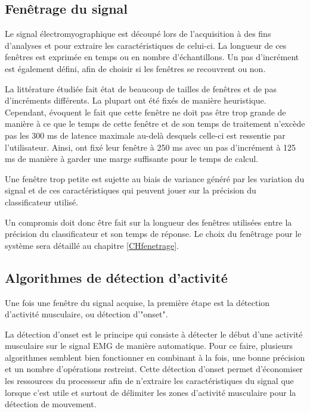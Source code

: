 \documentclass[letterpaper, twoside, 12pt, memoire, creativecommons, hyperref]{thETS}
\begin{document}
\subsection{Fenêtrage du signal}

Le signal électromyographique est découpé lors de l'acquisition à des fins d'analyses et pour extraire les caractéristiques de celui-ci. La longueur de ces fenêtres est exprimée en temps ou en nombre d'échantillons. Un pas d’incrément est également défini, afin de choisir si les fenêtres se recouvrent ou non. 

La littérature étudiée fait état de beaucoup de tailles de fenêtres et de pas d’incréments différents. La plupart ont été fixés de manière heuristique. Cependant, \cite{Englehart2003} évoquent le fait que cette fenêtre ne doit pas être trop grande de manière à ce que le temps de cette fenêtre et de son temps de traitement n’excède pas les 300 ms de latence maximale au-delà desquels celle-ci est ressentie par l’utilisateur. Ainsi, \cite{Englehart2003} ont fixé leur fenêtre à 250 ms avec un pas d’incrément à 125 ms de manière à garder une marge suffisante pour le temps de calcul. 

Une fenêtre trop petite est sujette au biais de variance généré par les variation du signal et de ces caractéristiques qui peuvent jouer sur la précision du classificateur utilisé.

Un compromis doit donc être fait sur la longueur des fenêtres utilisées entre la  précision du classificateur et son temps de réponse. Le choix du fenêtrage pour le système sera détaillé au chapitre \ref{CHfenetrage}.

\subsection{Algorithmes de détection d'activité}

Une fois une fenêtre du signal acquise, la première étape est la détection d'activité musculaire, ou détection d'"onset". 

La détection d’onset est le principe qui consiste à détecter le début d’une activité musculaire sur le signal EMG de manière automatique.  Pour ce faire, plusieurs algorithmes semblent bien fonctionner en combinant à la fois, une bonne précision et un nombre d’opérations restreint. Cette détection d’onset permet d’économiser les ressources du processeur afin  de n’extraire les caractéristiques du signal que lorsque c’est utile et surtout de délimiter les zones d’activité musculaire pour la détection de mouvement. 
\end{document}
